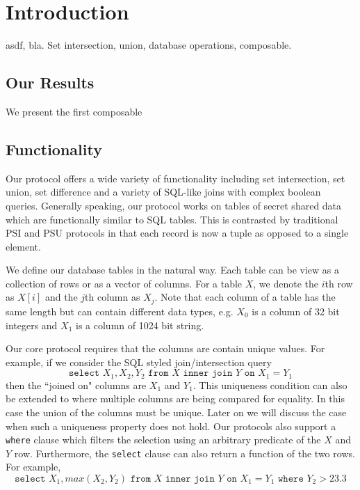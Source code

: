 \section{Introduction}

asdf, bla. Set intersection, union, database operations, composable.







\subsection{Our Results}

We present the first composable



\subsection{Functionality}

Our protocol offers a wide variety of functionality including set intersection, set union, set difference and a variety of SQL-like joins with complex boolean queries. Generally speaking, our protocol works on tables of secret shared data which are functionally similar to SQL tables. This is contrasted by traditional PSI and PSU protocols in that each record is now a tuple as opposed to a single element. 

We define our database tables in the natural way. Each table can be view as a collection of rows or as a vector of columns. For a table $X$, we denote the $i$th row as $X[i]$ and the $j$th column as $X_j$. Note that each column of a table has the same length but can contain different data types, e.g. $X_0$ is a column of 32 bit integers and $X_1$ is a column of 1024 bit string.

Our core protocol requires that the columns are contain unique values. For example, if we consider the SQL styled join/intersection query
$$
\texttt{select } X_1, X_2, Y_2 \texttt{ from } X \texttt{ inner join } Y \texttt{ on } X_1 = Y_1
$$
then the ``joined on" columns are $X_1$ and $Y_1$. This uniqueness condition can also be extended to where multiple columns are being compared for equality. In this case the union of the columns must be unique. Later on we will discuss the case when such a uniqueness property does not hold. Our protocols also support a \texttt{where} clause which filters the selection using an arbitrary predicate of the $X$ and $Y$ row. Furthermore, the \texttt{select} clause can also return a function of the two rows. For example,
$$
\texttt{select } X_1,max(X_2, Y_2)  \texttt{ from } X \texttt{ inner join } Y \texttt{ on } X_1 = Y_1 \texttt{ where } Y_2 > 23.3
$$

